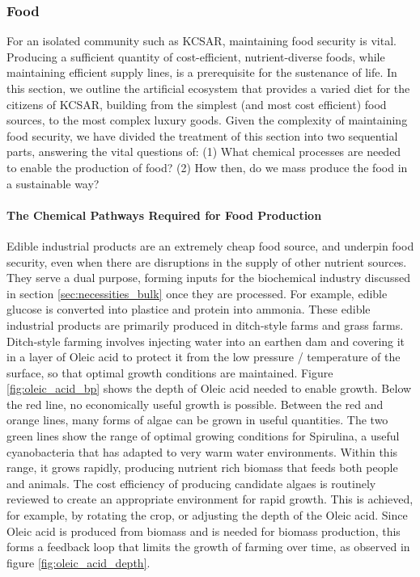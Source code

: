 \documentclass[fleqn,10pt]{Stylesheet} %
\begin{document}
\subsubsection{Food}
\label{sec:necessities_food}
 
For an isolated community such as KCSAR, maintaining food security is vital. Producing a sufficient quantity of cost-efficient, nutrient-diverse foods, while maintaining efficient supply lines, is a prerequisite for the sustenance of life. In this section, we outline the artificial ecosystem that provides a varied diet for the citizens of KCSAR, building from the simplest (and most cost efficient) food sources, to the most complex luxury goods. Given the complexity of maintaining food security, we have divided the treatment of this section into two sequential parts, answering the vital questions of: (1) What chemical processes are needed to enable the production of food? (2) How then, do we mass produce the food in a sustainable way?

\paragraph{The Chemical Pathways Required for Food Production}
Edible industrial products are an extremely cheap food source, and underpin food security, even when there are disruptions in the supply of other nutrient sources. They serve a dual purpose, forming inputs for the biochemical industry discussed in section \ref{sec:necessities_bulk} once they are processed. For example, edible glucose is converted into plastice and protein into ammonia. These edible industrial products are primarily produced in ditch-style farms and grass farms. Ditch-style farming involves injecting water into an earthen dam and covering it in a layer of Oleic acid to protect it from the low pressure / temperature of the surface, so that optimal growth conditions are maintained. Figure \ref{fig:oleic_acid_bp} shows the depth of Oleic acid needed to enable growth. Below the red line, no economically useful growth is possible. Between the red and orange lines, many forms of algae can be grown in useful quantities. The two green lines show the range of optimal growing conditions for Spirulina, a useful cyanobacteria that has adapted to very warm water environments. Within this range, it grows rapidly, producing nutrient rich biomass that feeds both people and animals. The cost efficiency of producing candidate algaes is routinely reviewed to create an appropriate environment for rapid growth. This is achieved, for example, by rotating the crop, or adjusting the depth of the Oleic acid. Since Oleic acid is produced from biomass and is needed for biomass production, this forms a feedback loop that limits the growth of farming over time, as observed in figure \ref{fig:oleic_acid_depth}. 
\end{document}
